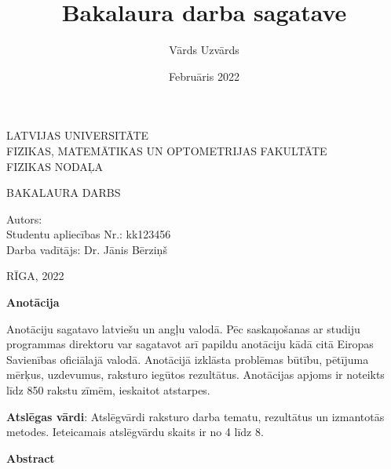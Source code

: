 \documentclass[12pt]{report}%
\author{Vārds Uzvārds}
\title{Bakalaura darba sagatave}
\date{Februāris 2022}
\theoremstyle{definition}
\def\degree{Bakalaura darbs}
\def\faculty{Fizikas, matemātikas un optometrijas fakultāte}
\def\department{Fizikas nodaļa}
\def\vietlaiks{Rīga, 2022}
\def\supervisor{Darba vadītājs: Dr. Jānis Bērziņš}
\def\studaplieciba{kk123456}
\begin{document}
\thispagestyle{empty}
\makeatletter
   \begin{center}
       \vspace*{1cm}
        
    \vspace{10mm}
    {\Large LATVIJAS UNIVERSITĀTE\\
    \MakeUppercase{\faculty}\\
    \vspace{2mm}
    \MakeUppercase{\department}}
    \vspace*{10mm}
    
    
    
    \vspace{5mm}
    {\Large \MakeUppercase{\textbf{\@title}}}
    \vspace{5mm}
    

       \vspace{1cm}
    \Large
    \MakeUppercase{\degree}
    \end{center}
    \vspace{3cm}
    \begin{flushleft}
    \large
       Autors: \textbf{\large \@author}\\
       Studentu apliecības Nr.: \studaplieciba \\
       \supervisor
    \end{flushleft}

       \vfill
     
    \begin{center}
    \Large      
    \MakeUppercase{\vietlaiks}
   \end{center}
\makeatother

\newpage




\thispagestyle{empty}
\noindent \textbf{Anotācija}

\noindent Anotāciju sagatavo latviešu un angļu valodā. Pēc saskaņošanas ar studiju
programmas direktoru var sagatavot arī papildu anotāciju kādā citā Eiropas Savienības oficiālajā
valodā. Anotācijā izklāsta problēmas būtību, pētījuma mērķus, uzdevumus, raksturo iegūtos
rezultātus. Anotācijas apjoms ir noteikts līdz 850 rakstu zīmēm, ieskaitot atstarpes.


\vspace{4mm}
\noindent \textbf{Atslēgas vārdi}: Atslēgvārdi raksturo darba tematu, rezultātus un izmantotās metodes. Ieteicamais
atslēgvārdu skaits ir no 4 līdz 8.

\vspace{20mm}
\noindent \textbf{Abstract}
\end{document}
